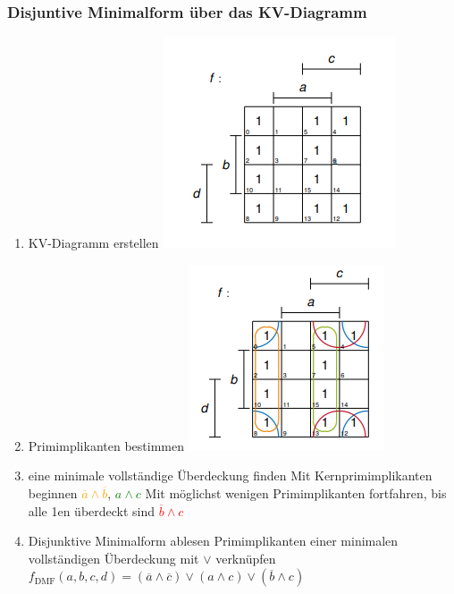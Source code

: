 \documentclass[12pt]{article}
\begin{document}
\subsubsection{Disjuntive Minimalform über das KV-Diagramm}
\begin{enumerate}
    \item KV-Diagramm erstellen
    \subitem \includegraphics{image5.png}
    \item Primimplikanten bestimmen
    \subitem \includegraphics{image6.png}
    \item eine minimale vollständige Überdeckung finden
    \subitem Mit Kernprimimplikanten beginnen
    \subsubitem \textcolor{orange}{$\overline{a} \land \overline{b}$}, \textcolor{green}{$a \land c$}
    \subitem \vbox{Mit möglichst wenigen Primimplikanten fortfahren, bis alle 1en überdeckt sind}
    \subsubitem \textcolor{red}{$\overline{b} \land c$}
    \item Disjunktive Minimalform ablesen
    \subitem \vbox{Primimplikanten einer minimalen vollständigen Überdeckung mit $\lor$ verknüpfen}
    \subitem $f_{\text{DMF}}(a,b,c,d) = (\overline{a} \land \overline{c}) \lor (a \land c) \lor (\overline{b} \land c)$
\end{enumerate}
\end{document}
